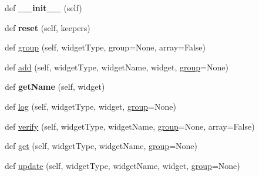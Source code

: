 \begin{DoxyCompactItemize}
\item 
\mbox{\label{class_python_01_g_u_i_1_1appjar_1_1_widget_manager_a9b7ebf0c964ca30a151f75caa5a06959}} 
def {\bfseries \+\_\+\+\_\+init\+\_\+\+\_\+} (self)
\item 
\mbox{\label{class_python_01_g_u_i_1_1appjar_1_1_widget_manager_a3cbb3c09f6f57958f2dde92d81ed0371}} 
def {\bfseries reset} (self, keepers)
\item 
def \hyperlink{class_python_01_g_u_i_1_1appjar_1_1_widget_manager_a6fa4043a5945618a9ded50173f06599d}{group} (self, widget\+Type, group=None, array=False)
\item 
def \hyperlink{class_python_01_g_u_i_1_1appjar_1_1_widget_manager_ac5dabd1d3e7ea54577b0f0834ee7cf84}{add} (self, widget\+Type, widget\+Name, widget, \hyperlink{class_python_01_g_u_i_1_1appjar_1_1_widget_manager_a6fa4043a5945618a9ded50173f06599d}{group}=None)
\item 
\mbox{\label{class_python_01_g_u_i_1_1appjar_1_1_widget_manager_a1f9c85b0af55e71a54c0698ba74a3134}} 
def {\bfseries get\+Name} (self, widget)
\item 
def \hyperlink{class_python_01_g_u_i_1_1appjar_1_1_widget_manager_a0fed8387800a09e64d62a47819da54af}{log} (self, widget\+Type, widget, \hyperlink{class_python_01_g_u_i_1_1appjar_1_1_widget_manager_a6fa4043a5945618a9ded50173f06599d}{group}=None)
\item 
def \hyperlink{class_python_01_g_u_i_1_1appjar_1_1_widget_manager_ad1027d466e6e667e6310f13fa73df2c8}{verify} (self, widget\+Type, widget\+Name, \hyperlink{class_python_01_g_u_i_1_1appjar_1_1_widget_manager_a6fa4043a5945618a9ded50173f06599d}{group}=None, array=False)
\item 
def \hyperlink{class_python_01_g_u_i_1_1appjar_1_1_widget_manager_a19270fe453a4d39780d54d5a076180e8}{get} (self, widget\+Type, widget\+Name, \hyperlink{class_python_01_g_u_i_1_1appjar_1_1_widget_manager_a6fa4043a5945618a9ded50173f06599d}{group}=None)
\item 
def \hyperlink{class_python_01_g_u_i_1_1appjar_1_1_widget_manager_acbedce7adb2442054dca32e44533c4c3}{update} (self, widget\+Type, widget\+Name, widget, \hyperlink{class_python_01_g_u_i_1_1appjar_1_1_widget_manager_a6fa4043a5945618a9ded50173f06599d}{group}=None)

\end{DoxyCompactItemize}
